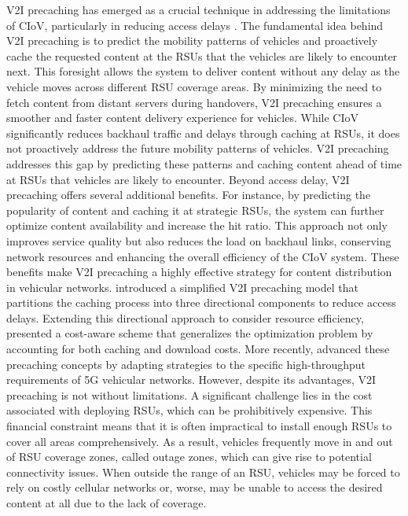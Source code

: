 \documentclass{aims}
\numberwithin{equation}{section}
\begin{document}
V2I precaching has emerged as a crucial technique in addressing the limitations of CIoV, particularly in reducing access delays \cite{Ikram2021, Zhao2021, Banerjee2022}. The fundamental idea behind V2I precaching is to predict the mobility patterns of vehicles and proactively cache the requested content at the RSUs that the vehicles are likely to encounter next. This foresight allows the system to deliver content without any delay as the vehicle moves across different RSU coverage areas. By minimizing the need to fetch content from distant servers during handovers, V2I precaching ensures a smoother and faster content delivery experience for vehicles. While CIoV significantly reduces backhaul traffic and delays through caching at RSUs, it does not proactively address the future mobility patterns of vehicles. V2I precaching addresses this gap by predicting these patterns and caching content ahead of time at RSUs that vehicles are likely to encounter. Beyond access delay, V2I precaching offers several additional benefits. For instance, by predicting the popularity of content and caching it at strategic RSUs, the system can further optimize content availability and increase the hit ratio. This approach not only improves service quality but also reduces the load on backhaul links, conserving network resources and enhancing the overall efficiency of the CIoV system. These benefits make V2I precaching a highly effective strategy for content distribution in vehicular networks. \cite{Ikram2021} introduced a simplified V2I precaching model that partitions the caching process into three directional components to reduce access delays. Extending this directional approach to consider resource efficiency, \cite{Zhao2021} presented a cost-aware scheme that generalizes the optimization problem by accounting for both caching and download costs. More recently, \cite{Banerjee2022} advanced these precaching concepts by adapting strategies to the specific high-throughput requirements of 5G vehicular networks. However, despite its advantages, V2I precaching is not without limitations. A significant challenge lies in the cost associated with deploying RSUs, which can be prohibitively expensive. This financial constraint means that it is often impractical to install enough RSUs to cover all areas comprehensively. As a result, vehicles frequently move in and out of RSU coverage zones, called outage zones, which can give rise to potential connectivity issues. When outside the range of an RSU, vehicles may be forced to rely on costly cellular networks or, worse, may be unable to access the desired content at all due to the lack of coverage.
\end{document}
